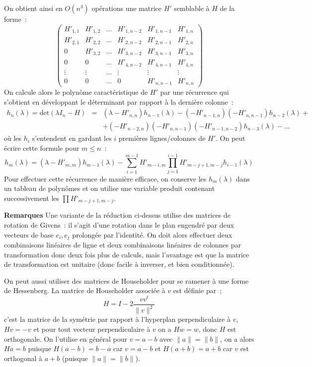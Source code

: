 \documentclass[a4paper,11pt]{article}
\begin{document}
On obtient ainsi en $O(n^3)$ opérations
une matrice $H'$ semblable à $H$ de la forme~:
\[
\left(\begin{array}{cccccc}
H'_{1,1} & H'_{1,2} & ... & H'_{1,n-2} & H'_{1,n-1} & H'_{1,n}\\
H'_{2,1} & H'_{2,2} & ... & H'_{2,n-2} & H'_{2,n-1} & H'_{2,n} \\
0       & H'_{3,2} & ... & H'_{3,n-2} & H'_{3,n-1} & H'_{3,n} \\
0       & 0       & ... & H'_{4,n-2} & H'_{4,n-1} & H'_{4,n} \\
\vdots  & \vdots  & ... & \vdots & \vdots  &  \vdots \\
0       & 0       & ... & 0 & H'_{n,n-1} & H'_{n,n}
\end{array} \right)
\]
On calcule alors le polynôme caractéristique de $H'$ par une récurrence
qui s'obtient en développant le déterminant par rapport à la derni\`ere
colonne~:
\begin{eqnarray*}
 h_n(\lambda) = \mbox{det}(\lambda I_n-H)&=& 
(\lambda-H'_{n,n}) h_{n-1}(\lambda) -(-H'_{n-1,n}) (-H'_{n,n-1}) 
h_{n-2}(\lambda) + \\
& & 
    + (-H'_{n-2,n}) (-H'_{n,n-1}) (-H'_{n-1,n-2}) h_{n-3}(\lambda) - ...
\end{eqnarray*}
où les $h_i$ s'entendent en gardant les $i$ premières lignes/colonnes de $H'$.
On peut \'ecrire cette formule pour $m\leq n$~:
\[ h_m(\lambda)= (\lambda - H'_{m,m}) h_{m-1}(\lambda)
-\sum_{i=1}^{m-1} H'_{m-i,m} \prod_{j=1}^{i-1} H'_{m-j+1,m-j} h_{i-1}(\lambda)\]
Pour effectuer cette r\'ecurrence de mani\`ere efficace, on conserve
les $h_m(\lambda)$ dans un tableau de polyn\^omes et on utilise une 
variable produit contenant successivement les $\prod H'_{m-j+1,m-j}$.

{\bf Remarques}
Une variante de la r\'eduction ci-dessus utilise des matrices de
rotation de Givens~: il s'agit d'une rotation
dans le plan engendr\'e par deux vecteurs de base $e_i,e_j$ 
prolong\'ee par l'identit\'e. On doit alors effectuer 
deux combinaisons lin\'eaires de ligne
et deux combinaisons lin\'eaires de colonnes par transformation
donc deux fois plus de calculs, mais l'avantage est que la matrice
de transformation est unitaire (donc facile \`a inverser, et bien
conditionn\'ee).

On peut aussi utiliser des matrices de
Householder 
pour  se ramener \`a une forme de Hessenberg.
La matrice de Householder associ\'ee \`a $v$ est d\'efinie par~;
$$H=I-2\frac{v v^t}{\|v\|^2}$$
c'est la matrice de la sym\'etrie par rapport \`a l'hyperplan 
perpendiculaire \`a $v$, $Hv=-v$ et pour tout vecteur
perpendiculaire \`a $v$ on a $Hw=w$, donc $H$ est orthogonale.
On l'utilise en g\'en\'eral pour $v=a-b$ avec $\|a\|=\|b\|$,
on a alors $Ha=b$ puisque $H(a-b)=b-a$ car $v=a-b$ et $H(a+b)=a+b$
car $v$ est orthogonal \`a $a+b$ (puisque $\|a\|=\|b\|$).
\end{document}
